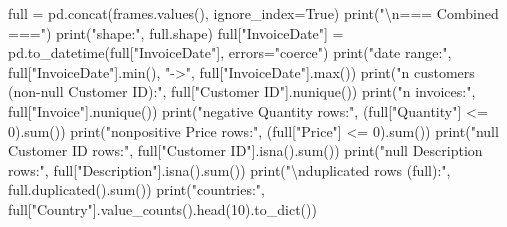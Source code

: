\documentclass[
]{ctexart}
\newenvironment{Shaded}{\begin{snugshade}}{\end{snugshade}}
\newcommand{\BuiltInTok}[1]{\textcolor[rgb]{0.00,0.23,0.31}{#1}}
\newcommand{\CharTok}[1]{\textcolor[rgb]{0.13,0.47,0.30}{#1}}
\newcommand{\DecValTok}[1]{\textcolor[rgb]{0.68,0.00,0.00}{#1}}
\newcommand{\NormalTok}[1]{\textcolor[rgb]{0.00,0.23,0.31}{#1}}
\newcommand{\OperatorTok}[1]{\textcolor[rgb]{0.37,0.37,0.37}{#1}}
\newcommand{\StringTok}[1]{\textcolor[rgb]{0.13,0.47,0.30}{#1}}
\newcommand{\VariableTok}[1]{\textcolor[rgb]{0.07,0.07,0.07}{#1}}
\begin{document}
\begin{Shaded}
\begin{Highlighting}[]
\NormalTok{full }\OperatorTok{=}\NormalTok{ pd.concat(frames.values(), ignore\_index}\OperatorTok{=}\VariableTok{True}\NormalTok{)}
\BuiltInTok{print}\NormalTok{(}\StringTok{"}\CharTok{\textbackslash{}n}\StringTok{=== Combined ==="}\NormalTok{)}
\BuiltInTok{print}\NormalTok{(}\StringTok{"shape:"}\NormalTok{, full.shape)}
\NormalTok{full[}\StringTok{"InvoiceDate"}\NormalTok{] }\OperatorTok{=}\NormalTok{ pd.to\_datetime(full[}\StringTok{"InvoiceDate"}\NormalTok{], errors}\OperatorTok{=}\StringTok{"coerce"}\NormalTok{)}
\BuiltInTok{print}\NormalTok{(}\StringTok{"date range:"}\NormalTok{, full[}\StringTok{"InvoiceDate"}\NormalTok{].}\BuiltInTok{min}\NormalTok{(), }\StringTok{"{-}\textgreater{}"}\NormalTok{, full[}\StringTok{"InvoiceDate"}\NormalTok{].}\BuiltInTok{max}\NormalTok{())}
\BuiltInTok{print}\NormalTok{(}\StringTok{"n customers (non{-}null Customer ID):"}\NormalTok{, full[}\StringTok{"Customer ID"}\NormalTok{].nunique())}
\BuiltInTok{print}\NormalTok{(}\StringTok{"n invoices:"}\NormalTok{, full[}\StringTok{"Invoice"}\NormalTok{].nunique())}
\BuiltInTok{print}\NormalTok{(}\StringTok{"negative Quantity rows:"}\NormalTok{, (full[}\StringTok{"Quantity"}\NormalTok{] }\OperatorTok{\textless{}=} \DecValTok{0}\NormalTok{).}\BuiltInTok{sum}\NormalTok{())}
\BuiltInTok{print}\NormalTok{(}\StringTok{"nonpositive Price rows:"}\NormalTok{, (full[}\StringTok{"Price"}\NormalTok{] }\OperatorTok{\textless{}=} \DecValTok{0}\NormalTok{).}\BuiltInTok{sum}\NormalTok{())}
\BuiltInTok{print}\NormalTok{(}\StringTok{"null Customer ID rows:"}\NormalTok{, full[}\StringTok{"Customer ID"}\NormalTok{].isna().}\BuiltInTok{sum}\NormalTok{())}
\BuiltInTok{print}\NormalTok{(}\StringTok{"null Description rows:"}\NormalTok{, full[}\StringTok{"Description"}\NormalTok{].isna().}\BuiltInTok{sum}\NormalTok{())}
\BuiltInTok{print}\NormalTok{(}\StringTok{"}\CharTok{\textbackslash{}n}\StringTok{duplicated rows (full):"}\NormalTok{, full.duplicated().}\BuiltInTok{sum}\NormalTok{())}
\BuiltInTok{print}\NormalTok{(}\StringTok{"countries:"}\NormalTok{, full[}\StringTok{"Country"}\NormalTok{].value\_counts().head(}\DecValTok{10}\NormalTok{).to\_dict())}
\end{Highlighting}
\end{Shaded}
\end{document}
